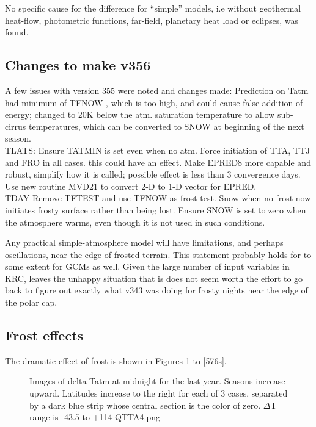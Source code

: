 \documentclass{article}
\begin{document}
No specific cause for the difference for ``simple'' models, i.e without geothermal heat-flow, photometric functions, far-field, planetary heat load or eclipses, was found. 

\subsection{Changes to make v356 \label{c356}} %
A few issues with version 355 were noted and changes made:
Prediction on Tatm had minimum of TFNOW , which is too high, and could cause
false addition of energy; changed to 20K below the atm. saturation 
temperature to allow sub-cirrus
temperatures, which can be converted to SNOW at beginning of the next season.
\\TLATS:
\qi Ensure  TATMIN is set even when no atm.
\qi Force initiation of TTA, TTJ and FRO in all cases. this could have an effect.
 \qi Make EPRED8 more capable and robust, simplify how it is called; possible effect is less than 3 convergence days.
\qii Use new routine MVD21 to convert 2-D to 1-D vector for EPRED.
\\ TDAY
\qi  Remove TFTEST and use TFNOW as frost test.
\qi  Snow when no frost now initiates frosty surface rather than being lost.
\qi Ensure SNOW is set to zero when the atmosphere warms, even though it is not used in such conditions.

Any practical simple-atmosphere model will have limitations, and perhaps
oscillations, near the edge of frosted terrain. This statement probably holds
for to some extent for GCMs as well. Given the large number of input variables
in KRC, leaves the unhappy situation that is does not seem worth the effort to
go back to figure out exactly what v343 was doing for frosty nights near the
edge of the polar cap.


 
\subsection{Frost effects}
 
 The dramatic effect of frost is shown in Figures  \ref{QTTA4} to \ref{576s}.

\begin{figure}[!ht] 
\caption[Image of delta Tatm]{Images of delta Tatm at midnight for the last
  year. Seasons increase upward. Latitudes increase to the right for each of 3
  cases, separated by a dark blue strip whose central section is the color of
  zero.  $\Delta$T range is -43.5 to +114
\label{QTTA4}  QTTA4.png }
\end{figure} 
\end{document}
